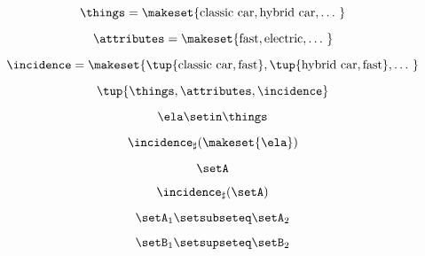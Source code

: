 {\begin{forslides}
        \begin{equation}
            \label{eq:slides_adjunctions_10}
            \things = \makeset{\text{classic car} ,\text{hybrid car}, \dots \ }
        \end{equation}

        \begin{equation}
            \label{eq:slides_adjunctions_11}
            \attributes = \makeset{\text{fast}, \text{electric}, \dots \ }
        \end{equation}

        \begin{equation}
            \label{eq:slides_adjunctions_12}
            \incidence = \makeset{\tup{\text{classic car}, \text{fast}}, \tup{\text{hybrid car}, \text{fast}}, \dots \ }
        \end{equation}

        \begin{equation}
            \label{eq:slides_adjunctions_13}
            \tup{\things, \attributes, \incidence}
        \end{equation}

        \begin{equation}
            \label{eq:slides_adjunctions_14}
            \ela \setin \things
        \end{equation}

        \begin{equation}
            \label{eq:slides_adjunctions_15}
            \incidence_\sharp(\makeset{\ela})
        \end{equation}

        \begin{equation}
            \label{eq:slides_adjunctions_16}
            \setA
        \end{equation}

        \begin{equation}
            \label{eq:slides_adjunctions_17}
            \incidence_\sharp(\setA)
        \end{equation}

        \begin{equation}
            \label{eq:slides_adjunctions_18}
            \setA_1 \setsubseteq \setA_2
        \end{equation}

        \begin{equation}
            \label{eq:slides_adjunctions_19}
            \setB_1 \setsupseteq \setB_2
        \end{equation}


\end{forslides}}
